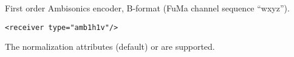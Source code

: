 First order Ambisonics encoder, B-format (FuMa channel sequence
``wxyz'').

\begin{lstlisting}[numbers=none]
<receiver type="amb1h1v"/>
\end{lstlisting}

The normalization attributes  (default) or
 are supported.

